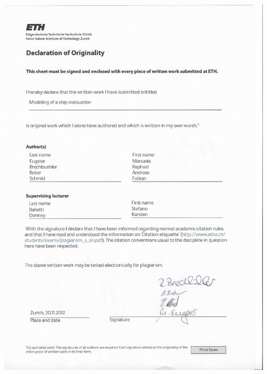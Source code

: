 \documentclass[11pt]{article}
\begin{document}
\includegraphics[width=\textwidth]{pics/declaration.jpg}




\tableofcontents

\newpage

\end{document}
